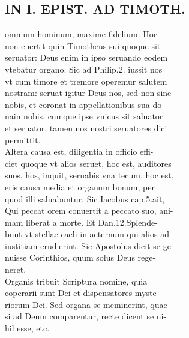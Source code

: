 \documentclass{article}
\begin{document}
\begin{pages}
\section*{IN I. EPIST. AD TIMOTH. \\
                }
omnium hominum, maxime fidelium. Hoc \\
                non euertit quin Timotheus sui quoque sit \\
                seruator: Deus enim in ipso seruando eodem \\
                vtebatur organo. Sic ad Philip.2. iussit nos \\
                vt cum timore et tremore operemur salutem \\
                nostram: seruat igitur Deus nos, sed non sine \\
                nobis, et coronat in appellationibus sua do- \\
                nain nobis, cumque ipse vnicus sit saluator \\
                et seruator, tamen nos nostri seruatores dici \\
                permittit. \\
                Altera causa est, diligentia in officio effi- \\
                ciet quoque vt alios seruet, hoc est, auditores \\
                suos, hos, inquit, seruabis vna tecum, hoc est, \\
                eris causa media et organum bonum, per \\
                quod illi saluabuntur. Sic Iacobus cap.5.ait, \\
                Qui peccat orem conuertit a peccato suo, ani- \\
                mam liberat a morte. Et Dan.12.Splende- \\
                bunt vt stellae caeli in aeternum qui alios ad \\
                iustitiam erudierint. Sic Apostolus dicit se ge \\
                nuisse Corinthios, quum solus Deus rege- \\
                neret. \\
                Organis tribuit Scriptura nomine, quia \\
                coperarii sunt Dei et dispensatores myste- \\
                riorum Dei. Sed organa se meminerint, quae \\
                si ad Deum comparentur, recte dicent se ni- \\
                hil esse, etc. \\
                

\end{pages}
\end{document}
